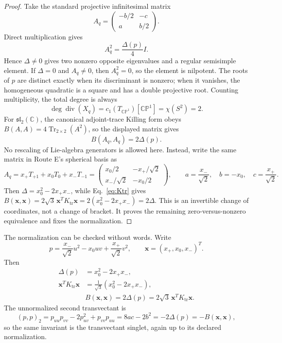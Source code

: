 \documentclass[11pt]{article}
\numberwithin{equation}{section}
\newcommand{\CP}{\mathbb{CP}}
\newcommand{\sltwo}{\mathfrak{sl}_2(\mathbb C)}
\newcommand{\Ktr}{K_{\mathrm{tr}}}
\newcommand{\Tr}{\operatorname{Tr}}
\newcommand{\divisor}{\operatorname{div}}
\begin{document}
\begin{proof}
Take the standard projective infinitesimal matrix
\begin{equation}
 A_q=
 \begin{pmatrix}-b/2&-c\\ a&b/2\end{pmatrix}.
\end{equation}
Direct multiplication gives
\begin{equation}
 A_q^2=\frac{\Delta(p)}4 I.
 \label{eq:AqSquare}
\end{equation}
Hence \(\Delta\ne0\) gives two nonzero opposite eigenvalues and a regular
semisimple element.  If \(\Delta=0\) and \(A_q\ne0\), then \(A_q^2=0\), so
the element is nilpotent.  The roots of \(p\) are distinct exactly when its
discriminant is nonzero; when it vanishes, the homogeneous quadratic is a
square and has a double projective root.  Counting multiplicity, the total
degree is always
\begin{equation}
 \deg\divisor(X_q)=c_1(T_{\CP^1})[\CP^1]=\chi(S^2)=2.
\end{equation}
For \(\sltwo\), the canonical adjoint-trace Killing form obeys
\(B(A,A)=4\Tr_{2\times2}(A^2)\), so the displayed matrix gives
\begin{equation}
 B(A_q,A_q)=2\Delta(p).
 \label{eq:canonicalBdelta}
\end{equation}
No rescaling of Lie-algebra generators is allowed here.  Instead, write the
 same matrix in Route E's spherical basis as
\begin{equation}
 A_q=x_+T_{+1}+x_0T_0+x_-T_{-1}
 =\begin{pmatrix}
 x_0/2&-x_+/\sqrt2\\ x_-/\sqrt2&-x_0/2
 \end{pmatrix},\qquad
 a=\frac{x_-}{\sqrt2},\quad b=-x_0,\quad
 c=\frac{x_+}{\sqrt2}.
 \label{eq:sphericalmap}
\end{equation}
Then \(\Delta=x_0^2-2x_+x_-\), while Eq.~\eqref{eq:Ktr} gives
\(B(\bm x,\bm x)=2\sqrt3\,\bm x^T\Ktr\bm x
=2(x_0^2-2x_+x_-)=2\Delta\).  This is an invertible change of coordinates,
not a change of bracket.  It proves the remaining zero-versus-nonzero
equivalence and fixes the normalization.
\end{proof}

The normalization can be checked without words.  Write
\begin{equation}
 p=\frac{x_-}{\sqrt2}u^2-x_0uv+\frac{x_+}{\sqrt2}v^2,
 \qquad \bm x=(x_+,x_0,x_-)^T.
\end{equation}
Then
\begin{align}
 \Delta(p)
 &=x_0^2-2x_+x_-,\\
 \bm x^T\Ktr\bm x
 &=\frac1{\sqrt3}(x_0^2-2x_+x_-),\\
 &\boxed{B(\bm x,\bm x)=2\Delta(p)
 =2\sqrt3\,\bm x^T\Ktr\bm x.}
 \label{eq:discKexact}
\end{align}
The unnormalized second transvectant is
\begin{equation}
 (p,p)_2=p_{uu}p_{vv}-2p_{uv}^2+p_{vv}p_{uu}
 =8ac-2b^2=-2\Delta(p)=-B(\bm x,\bm x),
\end{equation}
so the same invariant is the transvectant singlet, again up to its declared
normalization.
\end{document}
